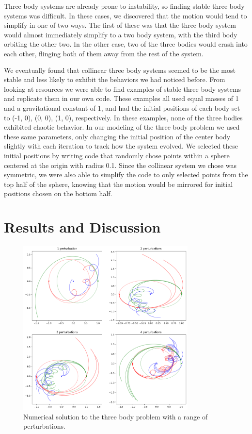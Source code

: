 \documentclass{article}
\begin{document}
Three body systems are already prone to instability, so finding stable three body systems was difficult. In these cases, we discovered that the motion would tend to simplify in one of two ways. The first of these was that the three body system would almost immediately simplify to a two body system, with the third body orbiting the other two. In the other case, two of the three bodies would crash into each other, flinging both of them away from the rest of the system. 

We eventually found that collinear three body systems seemed to be the most stable and less likely to exhibit the behaviors we had noticed before. From looking at resources we were able to find examples of stable three body systems and replicate them in our own code. These examples all used equal masses of 1 and a gravitational constant of 1, and had the initial positions of each body set to (-1, 0), (0, 0), (1, 0), respectively. In these examples, none of the three bodies exhibited chaotic behavior.
In our modeling of the three body problem we used these same parameters, only changing the initial position of the center body slightly with each iteration to track how the system evolved. We selected these initial positions by writing code that randomly chose points within a sphere centered at the origin with radius 0.1. Since the collinear system we chose was symmetric, we were also able to simplify the code to only selected points from the top half of the sphere, knowing that the motion would be mirrored for initial positions chosen on the bottom half. 
\newpage
\section{Results and Discussion}
\begin{figure}[h!]
    \centering
    \includegraphics[width=0.8\textwidth]{Images/perterbations1to4.png}
    \caption{Numerical solution to the three body problem with a range of perturbations.}
\end{figure}
\end{document}
